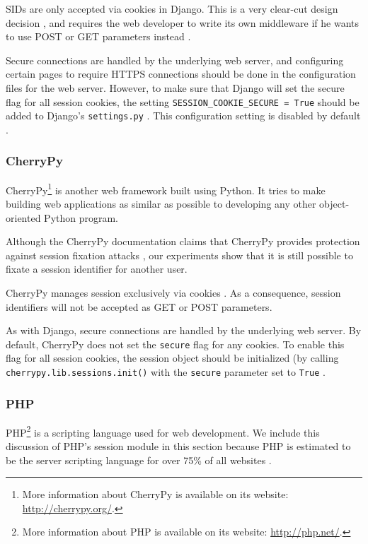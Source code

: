 SIDs are only accepted via cookies in Django. This is a very clear-cut design decision \cite{DjangoSessions}, and requires the web developer to write its own middleware if he wants to use POST or GET parameters instead \cite{Fairs2007}.

Secure connections are handled by the underlying web server, and configuring certain pages to require HTTPS connections should be done in the configuration files for the web server. However, to make sure that Django will set the secure flag for all session cookies, the setting \texttt{SESSION\_COOKIE\_SECURE = True} should be added to Django's \texttt{settings.py} \cite{Barnham2009}. This configuration setting is disabled by default \cite{Holovaty2008}.

\subsubsection{CherryPy}

CherryPy\footnote{More information about CherryPy is available on its website: \url{http://cherrypy.org/}.} is another web framework built using Python. It tries to make building web applications as similar as possible to developing any other object-oriented Python program.

Although the CherryPy documentation claims that CherryPy provides protection against session fixation attacks \cite{CherryPySessions}, our experiments show that it is still possible to fixate a session identifier for another user.%

CherryPy manages session exclusively via cookies \cite{CherryPySessions}. As a consequence, session identifiers will not be accepted as GET or POST parameters.

As with Django, secure connections are handled by the underlying web server. By default, CherryPy does not set the \texttt{secure} flag for any cookies. To enable this flag for all session cookies, the session object should be initialized (by calling \texttt{cherrypy.lib.sessions.init()} with the \texttt{secure} parameter set to \texttt{True} \cite{CherryPySessions}.

\subsubsection{PHP}

PHP\footnote{More information about PHP is available on its website: \url{http://php.net/}.} is a scripting language used for web development. We include this discussion of PHP's session module in this section because PHP is estimated to be the server scripting language for over 75\% of all websites \cite{ServerSurvey}.

